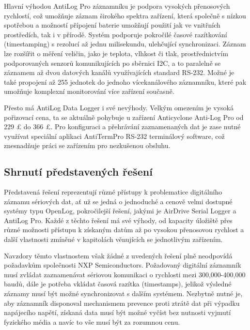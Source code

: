 Hlavní výhodou AntiLog Pro záznamníku je podpora vysokých přenosových rychlostí, což umožňuje záznam širokého spektra zařízení, která společně s nízkou spotřebou a možností přípojení baterie umožňují použití jak ve vnitřních prostředích, tak i v přírodě. Systém podporuje pokročilé časové razítkování (timestamping) s rezolucí až jednu milisekundu, ulehčující synchronizaci. Záznam lze rozšířit o měření veličin, jako je teplota, vlhkost či tlak, prostřednictvím podporovaných senzorů komunikujících po sběrnici I2C, a to paralelně se záznamem až dvou datových kanálů využívajících standard RS-232. Možné je také propojení až 255 jednotek do jednoho vícekanálového záznamníku, které pak umožňuje komplexní monitorování více zařízení současně. \cite{anticyclone_systems_antilog_pro, anticyclone_systems_antilog_pro_extended_logging}

Přesto má AntiLog Data Logger i své nevýhody. Velkým omezením je vysoká pořizovací cena, ta se aktuálně pohybuje u zařízení Anticyclone Anti-Log Pro od 229 £ do 366 £. Pro konfiguraci a přehrávání zaznamenaných dat je zase nutné využívat speciální aplikaci AntiTermPro RS-232 terminálový software, což znesnadňuje práci se zařízením pro nezkušenou obsluhu.  \cite{anticyclone_systems_antilog_pro, anticyclone_systems_antilog_pro_price}

\subsection{Shrnutí představených řešení}

Představená řešení reprezentují různé přístupy k problematice digitálního záznamu sériových dat, ať už se jedná o jednoduché a cenově velmi dostupné systémy typu OpenLog, pokročilejší řešení, jakými je  AirDrive Serial Logger a AntiLog Pro. Každé z těchto řešení má své výhody, od kapacity úložiště přes různé možnosti přístupu k získaným datům až po vysokou přenosovou rychlost a další vlastnosti zmíněné v kapitolách věnujících se jednotlivým zařízením.

Navzdory těmto vlastnostem však žádné z uvedených řešení plně neodpovídá požadavkům společnosti NXP Semiconductors. Požadovaný digitální záznamník musí zvládat zaznamenávat sériovou komunikaci o rychlosti mezi 300,000-400,000 baudů, dále je potřeba vkládat časová razítka (timestamps), jelikož výsledné záznamy musí být možné synchronizovat s dalším systémem. Nezbytně nutné je, aby záznamník disponoval mechanismem prevence proti ztrátě dat při výpadku napájecího napětí, získaná data musí být možné vyčíst bez nutnosti vyjmutí fyzického média a navíc to vše musí být za rozumnou cenu.

